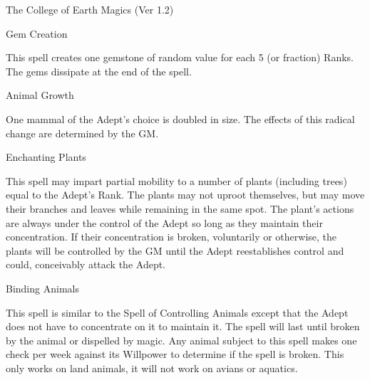 \begin{Chapter}{The College of Earth Magics (Ver 1.2)}
\begin{spell}[S-6]{Gem Creation }

\begin{effects}
This spell creates one gemstone of random value for each 5 (or
fraction) Ranks.  The gems dissipate at the end of the spell.
\end{effects}
\end{spell}

\begin{spell}[S-7]{Animal Growth }

\begin{effects}
One mammal of the Adept’s choice is doubled in size.  The effects of
this radical change are determined by the GM.

\end{effects}
\end{spell}

\begin{spell}[S-8]{Enchanting Plants }

\begin{effects}
This spell may impart partial mobility to a number of plants
(including trees) equal to the Adept’s Rank.  The plants may not
uproot themselves, but may move their branches and leaves while
remaining in the same spot.  The plant’s actions are always under the
control of the Adept so long as they maintain their concentration.  If
their concentration is broken, voluntarily or otherwise, the plants
will be controlled by the GM until the Adept reestablishes control and
could, conceivably attack the Adept.

\end{effects}
\end{spell}

\begin{spell}[S-9]{Binding Animals }

\begin{effects}
This spell is similar to the Spell of Controlling Animals except that
the Adept does not have to concentrate on it to maintain it.  The
spell will last until broken by the animal or dispelled by magic. Any
animal subject to this spell makes one check per week against its
Willpower to determine if the spell is broken.  This only works on
land animals, it will not work on avians or aquatics.


\end{effects}
\end{spell}
\end{Chapter}
